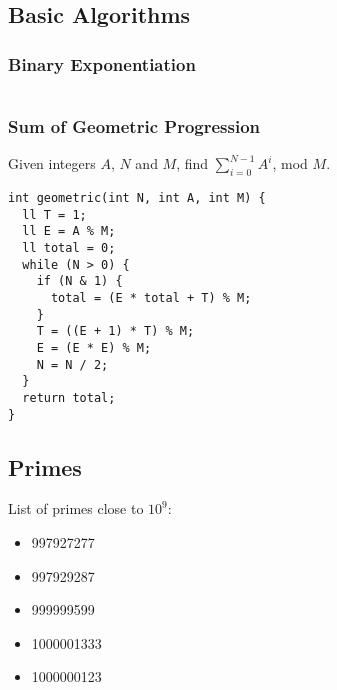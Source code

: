 \subsection{Basic Algorithms}

\begin{multicols}{2}
\subsubsection{Binary Exponentiation}

\hrulefill
\inputminted[autogobble,fontsize=\footnotesize]{C++}{Maths/binary_expo.cpp}
\vspace{-\baselineskip}
\noindent \hrulefill

\subsubsection{Sum of Geometric Progression}

Given integers $A$, $N$ and $M$, find $\displaystyle \sum_{i=0}^{N-1} A^i$, mod $M$.

\begin{lstlisting}
int geometric(int N, int A, int M) {
  ll T = 1;
  ll E = A % M;
  ll total = 0;
  while (N > 0) {
    if (N & 1) {
      total = (E * total + T) % M;
    }
    T = ((E + 1) * T) % M;
    E = (E * E) % M;
    N = N / 2;
  }
  return total;
}
\end{lstlisting}

\end{multicols}

\subsection{Primes}

List of primes close to $10^9$:
\begin{itemize}
  \item 997927277
  \item 997929287
  \item 999999599
  \item 1000001333
  \item 1000000123
\end{itemize}

\hrulefill \vspace{-\baselineskip}
\begin{multicols}{2}
\inputminted[autogobble,fontsize=\tiny]{C++}{Maths/primes.cpp}
\end{multicols}
\vspace{-\baselineskip}
\noindent \hrulefill

